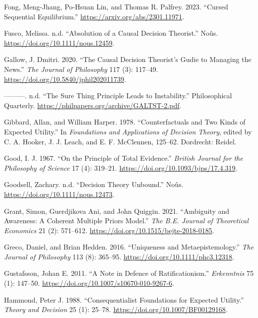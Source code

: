 \documentclass[
  12pt,
  letterpaper,
  DIV=11,
  numbers=noendperiod]{scrreprt}
\newlength{\cslhangindent}
\newenvironment{CSLReferences}[2] %
 {\begin{list}{}{%
  \setlength{\itemindent}{0pt}
  \setlength{\leftmargin}{0pt}
  \setlength{\parsep}{0pt}
  \ifodd #1
   \setlength{\leftmargin}{\cslhangindent}
   \setlength{\itemindent}{-1\cslhangindent}
  \fi
  \setlength{\itemsep}{#2\baselineskip}}}
 {\end{list}}
\begin{document}
\begin{CSLReferences}{1}{0}
Fong, Meng-Jhang, Po-Hsuan Lin, and Thomas R. Palfrey. 2023. {``Cursed
Sequential Equilibrium.''} \url{https://arxiv.org/abs/2301.11971}.

Fusco, Melissa. n.d. {``Absolution of a Causal Decision Theorist.''}
No{û}s. \url{https://doi.org/10.1111/nous.12459}.

Gallow, J. Dmitri. 2020. {``The Causal Decision Theorist's Gudie to
Managing the News.''} \emph{The Journal of Philosophy} 117 (3): 117--49.
\url{https://doi.org/10.5840/jphil202011739}.

---------. n.d. {``The Sure Thing Principle Leads to Instability.''}
Philosophical Quarterly.
\url{https://philpapers.org/archive/GALTST-2.pdf}.

Gibbard, Allan, and William Harper. 1978. {``Counterfactuals and Two
Kinds of Expected Utility.''} In \emph{Foundations and Applications of
Decision Theory}, edited by C. A. Hooker, J. J. Leach, and E. F.
McClennen, 125--62. Dordrecht: Reidel.

Good, I. J. 1967. {``On the Principle of Total Evidence.''}
\emph{British Journal for the Philosophy of Science} 17 (4): 319--21.
\url{https://doi.org/10.1093/bjps/17.4.319}.

Goodsell, Zachary. n.d. {``Decision Theory Unbound.''} No{û}s.
\url{https://doi.org/10.1111/nous.12473}.

Grant, Simon, Guerdjikova Ani, and John Quiggin. 2021. {``Ambiguity and
Awareness: A Coherent Multiple Priors Model.''} \emph{The B.E. Journal
of Theoretical Economics} 21 (2): 571--612.
\url{https://doi.org/10.1515/bejte-2018-0185}.

Greco, Daniel, and Brian Hedden. 2016. {``Uniqueness and
Metaepistemology.''} \emph{The Journal of Philosophy} 113 (8): 365--95.
\url{https://doi.org/10.1111/phc3.12318}.

Gustafsson, Johan E. 2011. {``A Note in Defence of Ratificationism.''}
\emph{Erkenntnis} 75 (1): 147--50.
\url{https://doi.org/10.1007/s10670-010-9267-6}.

Hammond, Peter J. 1988. {``Consequentialist Foundations for Expected
Utility.''} \emph{Theory and Decision} 25 (1): 25--78.
\url{https://doi.org/10.1007/BF00129168}.


\end{CSLReferences}
\end{document}
